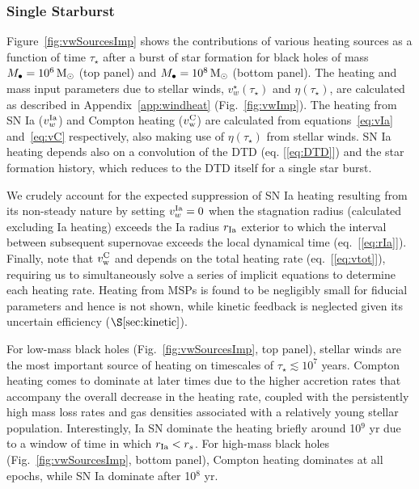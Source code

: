 \documentclass[usenatbib,fleqn]{mn2e}
\newcommand{\rs}{r_s}
\newcommand{\Mbh}[1][]{M_{\bullet#1}}
\begin{document}
\subsubsection{Single Starburst}

Figure~\ref{fig:vwSourcesImp} shows the contributions of various
heating sources as a function of time $\tau_{\star}$ after a burst of
star formation for black holes of mass $\Mbh = 10^{6} \Msun$ (top
panel) and $\Mbh = 10^{8} \Msun$ (bottom panel). The heating and mass
input parameters due to stellar winds, $v_{w}^{\star}(\tau_{\star})$
and $\eta(\tau_{\star})$, are calculated as described in
Appendix~\ref{app:windheat} (Fig.~\ref{fig:vwImp}).  The heating from
SN Ia ($v_{w}^{\rm Ia}$) and Compton heating ($v_{\rm w}^{\rm C}$) are
calculated from equations~\eqref{eq:vIa} and~\eqref{eq:vC}
respectively, also making use of $\eta(\tau_{\star})$ from stellar
winds.  SN Ia heating depends also on a convolution of the DTD
(eq. [\ref{eq:DTD}]) and the star formation history, which reduces to
the DTD itself for a single star burst.

We crudely account for the expected suppression of SN Ia heating
resulting from its non-steady nature by setting $v_{w}^{\rm Ia} = 0$
when the stagnation radius (calculated excluding Ia heating) exceeds
the Ia radius $r_{\rm Ia}$ exterior to which the interval between
subsequent supernovae exceeds the local dynamical time
(eq.~[\ref{eq:rIa}]).  Finally, note that $v_{\rm w}^{\rm C}$ and
depends on the total heating rate (eq.~[\ref{eq:vtot}]), requiring us
to simultaneously solve a series of implicit equations to determine
each heating rate.  Heating from MSPs is found to be negligibly small
for fiducial parameters and hence is not shown, while kinetic feedback
is neglected given its uncertain efficiency ($\S\ref{sec:kinetic}$).

For low-mass black holes (Fig.~\ref{fig:vwSourcesImp}, top panel),
stellar winds are the most important source of heating on timescales
of $\tau_{\star} \lesssim 10^{7}$ years.  Compton heating comes to
dominate at later times due to the higher accretion rates that
accompany the overall decrease in the heating rate, coupled with the
persistently high mass loss rates and gas densities associated with a
relatively young stellar population.  Interestingly, Ia SN dominate
the heating briefly around 10$^{9}$ yr due to a window of time in
which $r_{ \rm Ia} < \rs$.  For high-mass black holes
(Fig.~\ref{fig:vwSourcesImp}, bottom panel), Compton heating dominates
at all epochs, while SN Ia dominate after 10$^{8}$ yr.
\end{document}
